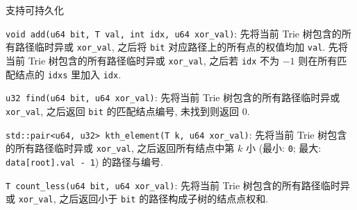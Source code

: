 支持可持久化

\verb|void add(u64 bit, T val, int idx, u64 xor_val)|: 先将当前 Trie 树包含的所有路径临时异或 \verb|xor_val|, 之后将 \verb|bit| 对应路径上的所有点的权值均加 \verb|val|. 先将当前 Trie 树包含的所有路径临时异或 \verb|xor_val|, 之后若 \verb|idx| 不为 \(-1\) 则在所有匹配结点的 \verb|idxs| 里加入 \verb|idx|.
    
\verb|u32 find(u64 bit, u64 xor_val)|: 先将当前 Trie 树包含的所有路径临时异或 \verb|xor_val|, 之后返回 \verb|bit| 的匹配结点编号, 未找到则返回 \(0\).

\verb|std::pair<u64, u32> kth_element(T k, u64 xor_val)|: 先将当前 Trie 树包含的所有路径临时异或 \verb|xor_val|, 之后返回所有结点中第 \(k\) 小 (最小: \verb|0|; 最大: \verb|data[root].val - 1|) 的路径与编号.

\verb|T count_less(u64 bit, u64 xor_val)|: 先将当前 Trie 树包含的所有路径临时异或 \verb|xor_val|, 之后返回小于 \verb|bit| 的路径构成子树的结点点权和.
